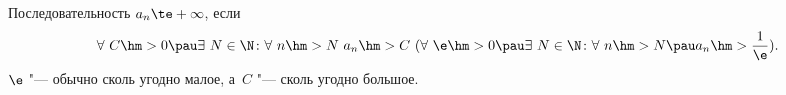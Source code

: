 
Последовательность $a_n\te+\infty$, если
$$\forall\  C\hm>0\pau \exists\  N\in\N\colon \forall\  n\hm>N\ a_n\hm>C
\text{ (}\forall\  \e\hm>0\pau \exists\  N\in\N\colon \forall\  n\hm>N\pau a_n\hm>\frac1\e\text{)}.$$
$\e$ "--- обычно сколь угодно малое, а~$C$  "--- сколь угодно большое.
